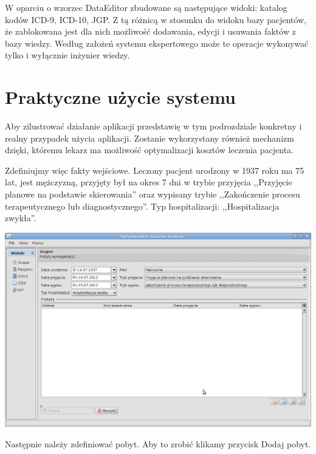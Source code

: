 W oparciu o wzorzec DataEditor zbudowane są następujące widoki: katalog kodów ICD-9, ICD-10, JGP. Z tą różnicą w stosunku do widoku bazy pacjentów, że zablokowana jest dla nich możliwość dodawania, edycji i usuwania faktów z bazy wiedzy. Według założeń systemu ekspertowego może te operacje wykonywać tylko i wyłącznie inżynier wiedzy.


\section{Praktyczne użycie systemu}
\label{sec:praktyczneUzycieSystemu}
Aby zilustrować działanie aplikacji przedstawię w tym podrozdziale konkretny i realny przypadek użycia aplikacji. Zostanie wykorzystany również mechanizm dzięki, któremu lekarz ma możliwość optymalizacji kosztów leczenia pacjenta.

Zdefiniujmy więc fakty wejściowe. Leczony pacjent urodzony w 1937 roku ma 75 lat, jest mężczyzną, przyjęty był na okres 7 dni w trybie przyjęcia ,,Przyjęcie planowe na podstawie skierowania'' oraz wypisany trybie ,,Zakończenie procesu terapeutycznego lub diagnostycznego''. Typ hospitalizacji: ,,Hospitalizacja zwykła''.

\includegraphics[scale=0.4]{images/gruper1}

Następnie należy zdefiniować pobyt. Aby to zrobić klikamy przycisk Dodaj pobyt.

